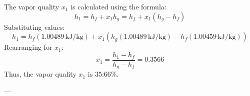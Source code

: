 The vapor quality \( x_1 \) is calculated using the formula:  
\[
h_1 = h_f + x_1 h_g = h_f + x_1 (h_g - h_f)
\]  
Substituting values:  
\[
h_1 = h_f (1.00489 \, \text{kJ/kg}) + x_1 (h_g (1.00489 \, \text{kJ/kg}) - h_f (1.00459 \, \text{kJ/kg}))
\]  
Rearranging for \( x_1 \):  
\[
x_1 = \frac{h_1 - h_f}{h_g - h_f} = 0.3566
\]  
Thus, the vapor quality \( x_1 \) is \( 35.66\% \).  

---